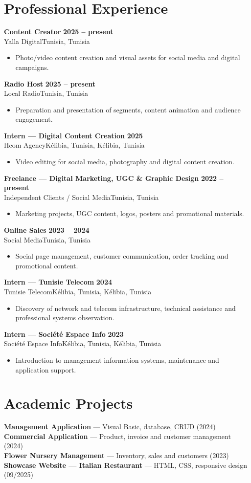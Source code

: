 \documentclass[a4paper,10pt]{article}
\newcommand{\cventry}[4]{%
  \textbf{#1} \hfill \textbf{#4}\\[1pt]
  #2{\ifx\relax#3\relax\else, #3\fi}\par\vspace{1.5pt}}
\begin{document}
\section{Professional Experience}
\cventry{Content Creator}{Yalla Digital}{Tunisia}{2025 -- present}
\begin{itemize}
  \item Photo/video content creation and visual assets for social media and digital campaigns.
\end{itemize}
\cventry{Radio Host}{Local Radio}{Tunisia}{2025 -- present}
\begin{itemize}
  \item Preparation and presentation of segments, content animation and audience engagement.
\end{itemize}
\cventry{Intern — Digital Content Creation}{Hcom Agency}{Kélibia, Tunisia}{2025}
\begin{itemize}
  \item Video editing for social media, photography and digital content creation.
\end{itemize}
\cventry{Freelance — Digital Marketing, UGC \& Graphic Design}{Independent Clients / Social Media}{Tunisia}{2022 -- present}
\begin{itemize}
  \item Marketing projects, UGC content, logos, posters and promotional materials.
\end{itemize}
\cventry{Online Sales}{Social Media}{Tunisia}{2023 -- 2024}
\begin{itemize}
  \item Social page management, customer communication, order tracking and promotional content.
\end{itemize}
\cventry{Intern — Tunisie Telecom}{Tunisie Telecom}{Kélibia, Tunisia}{2024}
\begin{itemize}
  \item Discovery of network and telecom infrastructure, technical assistance and professional systems observation.
\end{itemize}
\cventry{Intern — Société Espace Info}{Société Espace Info}{Kélibia, Tunisia}{2023}
\begin{itemize}
  \item Introduction to management information systems, maintenance and application support.
\end{itemize}
\section{Academic Projects}
\textbf{Management Application} — Visual Basic, database, CRUD (2024)\\[1pt]
\textbf{Commercial Application} — Product, invoice and customer management (2024)\\[1pt]
\textbf{Flower Nursery Management} — Inventory, sales and customers (2023)\\[1pt]
\textbf{Showcase Website — Italian Restaurant} — HTML, CSS, responsive design (09/2025)
\end{document}
